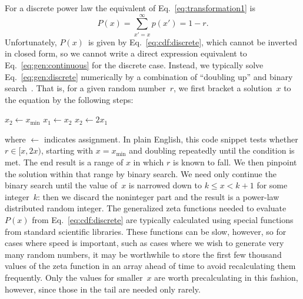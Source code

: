 \documentclass[final]{siamltex}
\newcommand{\xmin}{\ensuremath{x_{\min}}}
\begin{document}
\begin{appendix}
For a discrete power law the equivalent of Eq.~\eqref{eq:transformation1}
is
\begin{equation}
\label{eq:gen:discrete}
P(x) = \sum_{x'=x}^\infty p(x') = 1 - r.
\end{equation}
Unfortunately, $P(x)$~is given by Eq.~\eqref{eq:cdf:discrete}, which cannot
be inverted in closed form, so we cannot write a direct expression
equivalent to Eq.~\eqref{eq:gen:continuous} for the discrete case.
Instead, we typically solve Eq.~\eqref{eq:gen:discrete} numerically by a
combination of ``doubling up'' and binary
search~\cite{Numerical-Recipes-in-C}.  That is, for a given random
number~$r$, we first bracket a solution~$x$ to the equation by the
following steps:
\begin{algorithmic}
 \STATE $x_2 \leftarrow \xmin$
 \REPEAT
   \STATE $x_1 \leftarrow x_2$
   \STATE $x_2 \leftarrow 2x_1$
\end{algorithmic}
\medbreak
\noindent where $\leftarrow$ indicates assignment.  In plain English, this
code snippet tests whether $r\in[x,2x)$, starting with $x=x_{\min}$ and
doubling repeatedly until the condition is met.  The end result is a range
of $x$ in which $r$ is known to fall.  We then pinpoint the solution within
that range by binary search.  We need only continue the binary search until
the value of~$x$ is narrowed down to $k\le x<k+1$ for some integer~$k$:
then we discard the noninteger part and the result is a power-law
distributed random integer.  The generalized zeta functions needed to
evaluate $P(x)$ from Eq.~\eqref{eq:cdf:discrete} are typically calculated
using special functions from standard scientific libraries.  These
functions can be slow, however, so for cases where speed is important, such
as cases where we wish to generate very many random numbers, it may be
worthwhile to store the first few thousand values of the zeta function in
an array ahead of time to avoid recalculating them frequently.  Only the
values for smaller~$x$ are worth precalculating in this fashion, however,
since those in the tail are needed only rarely.


\end{appendix}
\end{document}
